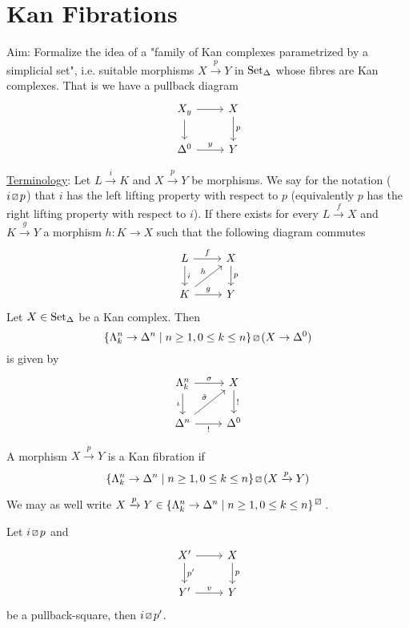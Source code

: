 \section{Kan Fibrations}

Aim: Formalize the idea of a "family of Kan complexes parametrized by a simplicial set", i.e. suitable morphisms $X \xrightarrow{p} Y$ in $\operatorname{Set}_{\Delta}$ whose fibres are Kan complexes.
That is we have a pullback diagram
\[
\begin{tikzcd}
    X_y
    \arrow[d]
    \ar[r]
    &
    X
    \ar[d,"p"]
    \\
    \Delta^0
    \ar[r,"y"]
    &
    Y    
\end{tikzcd}
\]

\underline{Terminology}:
Let $ L \xrightarrow{i} K$ and $ X \xrightarrow{p} Y$ be morphisms.
We say for the notation ($ i \lift{} p$) that $i$ has the left lifting property with respect to $p$ (equivalently $p$ has the right lifting property with respect to $i$).
If there exists for every $L \xrightarrow{f} X$ and $K \xrightarrow{g}Y$ a morphism $h:K \to X$ such that the following diagram commutes
\[
\begin{tikzcd}
    L
    \arrow[d,"i"]
    \ar[r, "f"]
    &
    X
    \ar[d,"p"]
    \\
    K
    \ar[ru,"h"]
    \ar[r,"g"]
    &
    Y    
\end{tikzcd}
\]
Let $X \in \operatorname{Set}_{\Delta}$ be a Kan complex. 
Then 
\[
\{ \Lambda_k^n \to \Delta^n \mid n\geq 1 ,0 \leq k \leq n \} \lift{} (X \to \Delta^0)
\]
is given by 
\[
\begin{tikzcd}
    \Lambda_k^n
    \arrow[d,"\iota"']
    \ar[r, "\sigma"]
    &
    X
    \ar[d,"!"]
    \\
    \Delta^n
    \ar[ru,"\Tilde{\sigma}"]
    \ar[r,"!"']
    &
    \Delta^0
\end{tikzcd}
\]

\begin{defi}
    A morphism $X \xrightarrow{p} Y$ is a Kan fibration if 
    \[
    \{ \Lambda_k^n \to \Delta^n \mid n\geq 1 ,0 \leq k \leq n \} \lift{} (X \xrightarrow{p} Y)
    \]
\end{defi}

\begin{rmk}
    We may as well write $X \xrightarrow{p} Y \in \{ \Lambda_k^n \to \Delta^n \mid n\geq 1 , 0 \leq k \leq n\}^{\lift{}}$.
\end{rmk}

\begin{lem}
    Let $i \lift{} p$ and
    \[
    \begin{tikzcd}
        X'
        \arrow[d,"p'"]
        \ar[r]
        &
        X
        \ar[d,"p"]
        \\
        Y'
        \ar[r,"v"]
        &
        Y    
    \end{tikzcd}
    \]
    be a pullback-square, then $i \lift{} p'$.
\end{lem}

